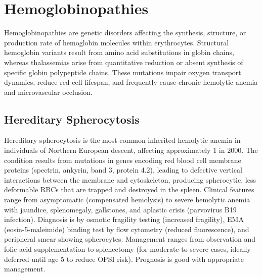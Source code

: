 \section{Hemoglobinopathies}




Hemoglobinopathies are genetic disorders affecting the synthesis, structure, or production rate of hemoglobin molecules within erythrocytes. Structural hemoglobin variants result from amino acid substitutions in globin chains, whereas thalassemias arise from quantitative reduction or absent synthesis of specific globin polypeptide chains. These mutations impair oxygen transport dynamics, reduce red cell lifespan, and frequently cause chronic hemolytic anemia and microvascular occlusion.





\label{sec:Hemoglobinopathies}

\subsection{Hereditary Spherocytosis}
\label{sec:Hereditary Spherocytosis}
Hereditary spherocytosis is the most common inherited hemolytic anemia in individuals of Northern European descent, affecting approximately 1 in 2000. The condition results from mutations in genes encoding red blood cell membrane proteins (spectrin, ankyrin, band 3, protein 4.2), leading to defective vertical interactions between the membrane and cytoskeleton, producing spherocytic, less deformable RBCs that are trapped and destroyed in the spleen. Clinical features range from asymptomatic (compensated hemolysis) to severe hemolytic anemia with jaundice, splenomegaly, gallstones, and aplastic crisis (parvovirus B19 infection). Diagnosis is by osmotic fragility testing (increased fragility), EMA (eosin-5-maleimide) binding test by flow cytometry (reduced fluorescence), and peripheral smear showing spherocytes. Management ranges from observation and folic acid supplementation to splenectomy (for moderate-to-severe cases, ideally deferred until age 5 to reduce OPSI risk). Prognosis is good with appropriate management.

